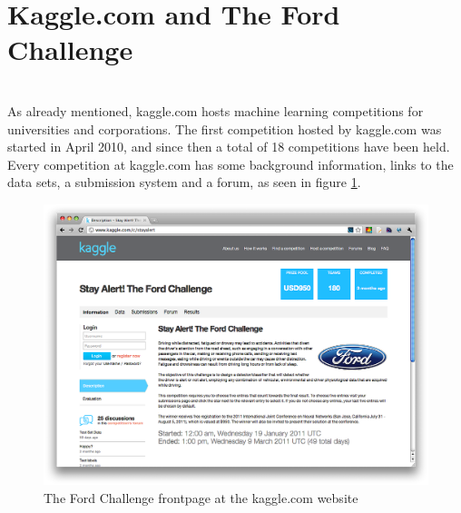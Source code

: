 \section{Kaggle.com and The Ford Challenge}
\\
As already mentioned, kaggle.com hosts machine learning competitions for universities and corporations. The first competition hosted by kaggle.com was started in April 2010, and since then a total of 18 competitions have been held. Every competition at kaggle.com has some background information, links to the data sets, a submission system and a forum, as seen in figure \ref{fig:fordchallenge_frontpage}. \par

\begin{figure}[tbhHp]
    \centering
        \includegraphics[width=.9\textwidth]{media/fordchallenge_frontpage.png}
    \caption{The Ford Challenge frontpage at the kaggle.com website}
    \label{fig:fordchallenge_frontpage}
\end{figure}


